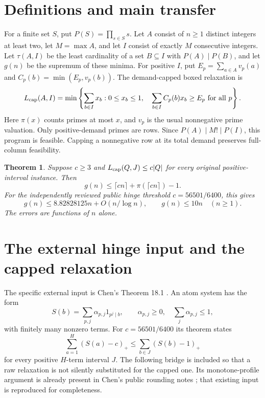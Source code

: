 \documentclass[11pt,a4paper]{article}
\newtheorem{theorem}{Theorem}[section]
\newcommand{\LP}{L_{\rm cap}}
\newcommand{\pos}[1]{(#1)_+}
\begin{document}

\tableofcontents
\medskip
\section{Definitions and main transfer}
For a finite set $S$, put $P(S)=\prod_{s\in S}s$. Let $A$ consist of $n\ge1$
distinct integers at least two, let $M=\max A$, and let $I$ consist of exactly
$M$ consecutive integers. Let $\tau(A,I)$ be the least cardinality of a
set $B\subseteq I$ with $P(A)\mid P(B)$, and let $g(n)$ be the supremum of
these minima. For positive $I$, put $E_p=\sum_{a\in A}v_p(a)$ and
$C_p(b)=\min(E_p,v_p(b))$. The demand-capped boxed relaxation is
\[
 \LP(A,I)=\min\left\{\sum_{b\in I}x_b:
 0\le x_b\le1,\quad \sum_{b\in I}C_p(b)x_b\ge E_p\ \text{for all }p\right\}.
\]
Here $\pi(x)$ counts primes at most $x$, and $v_p$ is the usual nonnegative prime valuation. Only positive-demand primes are rows. Since $P(A)\mid M!\mid P(I)$,
this program is feasible. Capping a nonnegative row at its total demand
preserves full-column feasibility.

\begin{theorem}\label{thm:constant}
Suppose $c\ge3$ and $\LP(Q,J)\le c|Q|$ for every original positive-interval
instance. Then
\[
 g(n)\le\lceil cn\rceil+\pi(\lceil cn\rceil)-1.
\]
For the independently reviewed public hinge threshold
$c=56501/6400$, this gives
\[
 g(n)\le 8.82828125n+O(n/\log n),\qquad g(n)\le10n\quad(n\ge1).
\]
The errors are functions of $n$ alone.
\end{theorem}

\section{The external hinge input and the capped relaxation}
The specific external input is Chen's Theorem 18.1 \cite{Chen}. An atom
system has the form
\[
 S(b)=\sum_{p,j}\alpha_{p,j}1_{p^j\mid b},\qquad
 \alpha_{p,j}\ge0,\quad \sum_j\alpha_{p,j}\le1,
\]
with finitely many nonzero terms. For $c=56501/6400$ its theorem states
\[
 \sum_{a=1}^H\pos{S(a)-c}\le\sum_{b\in J}\pos{S(b)-1}
 \tag{$H_c$}
\]
for every positive $H$-term interval $J$. The following bridge is included
so that a raw relaxation is not silently substituted for the capped one.
Its monotone-profile argument is already present in Chen's public rounding
notes \cite{ChenNotes}; that existing input is reproduced for completeness.
\end{document}

